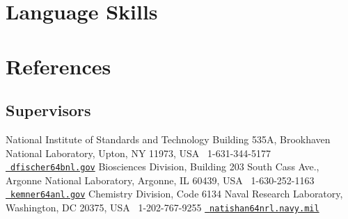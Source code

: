 \documentclass[11pt]{moderncv}
\begin{document}


\section{Language Skills}

\section{References}
\subsection{Supervisors}
%
{National Institute of Standards and Technology\newline
  Building 535A, Brookhaven National Laboratory, Upton, NY 11973, USA\newline
  \phonesymbol\ 1-631-344-5177\quad
  \href{mailto:dfischer@bnl.gov}{\emailsymbol\ \footnotesize\texttt{dfischer\char64bnl.gov}}}
%
{Biosciences Division, Building 203 South Cass Ave., Argonne National Laboratory, Argonne, IL 60439, USA\newline
  \phonesymbol\ 1-630-252-1163\quad
  \href{mailto:kemner@anl.gov}{\emailsymbol\ \footnotesize\texttt{kemner\char64anl.gov}}}
%
{Chemistry Division, Code 6134\newline
  Naval Research Laboratory, Washington, DC 20375, USA\newline
  \phonesymbol\ 1-202-767-9255\quad
  \href{mailto:natishan@nrl.navy.mil}{\emailsymbol\ \footnotesize\texttt{natishan\char64nrl.navy.mil}}}
\end{document}
